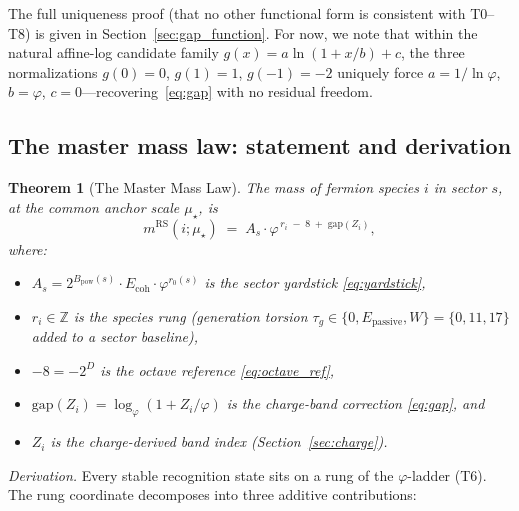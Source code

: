\documentclass[11pt,a4paper]{article}
\newtheorem{theorem}{Theorem}[section]
\theoremstyle{definition}
\theoremstyle{remark}
\newcommand{\phig}{\varphi}
\newcommand{\Ecoh}{E_{\mathrm{coh}}}
\newcommand{\muStar}{\mu_{\star}}
\newcommand{\mRS}{m^{\mathrm{RS}}}
\newcommand{\Epass}{E_{\mathrm{passive}}}
\newcommand{\Zidx}{Z}
\begin{document}
The full uniqueness proof (that no other functional form is consistent with
T0--T8) is given in Section~\ref{sec:gap_function}.  For now, we note that
within the natural affine-log candidate family $g(x) = a\ln(1 + x/b) + c$,
the three normalizations $g(0) = 0$, $g(1) = 1$, $g(-1) = -2$ uniquely force
$a = 1/\ln\phig$, $b = \phig$, $c = 0$---recovering~\eqref{eq:gap} with no
residual freedom.

\subsection{The master mass law: statement and derivation}

\begin{theorem}[The Master Mass Law]
\label{thm:mass_law}
The mass of fermion species $i$ in sector $s$, at the common anchor scale
$\muStar$, is
\begin{equation}
  \boxed{\mRS(i;\muStar) \;=\;
    A_s \cdot \phig^{\,r_i \;-\; 8 \;+\; \mathrm{gap}(\Zidx_i)},}
  \label{eq:mass_law}
\end{equation}
where:
\begin{itemize}[nosep]
  \item $A_s = 2^{B_{\mathrm{pow}}(s)} \cdot \Ecoh \cdot \phig^{r_0(s)}$ is
        the sector yardstick \eqref{eq:yardstick},
  \item $r_i \in \mathbb{Z}$ is the species rung (generation torsion
        $\tau_g \in \{0, \Epass, W\} = \{0, 11, 17\}$ added to a sector
        baseline),
  \item $-8 = -2^D$ is the octave reference \eqref{eq:octave_ref},
  \item $\mathrm{gap}(\Zidx_i) = \log_\phig(1 + \Zidx_i/\phig)$ is the
        charge-band correction \eqref{eq:gap}, and
  \item $\Zidx_i$ is the charge-derived band index (Section~\ref{sec:charge}).
\end{itemize}
\end{theorem}

\noindent\textit{Derivation.}\quad
Every stable recognition state sits on a rung of the $\phig$-ladder (T6).
The rung coordinate decomposes into three additive contributions:
\end{document}
